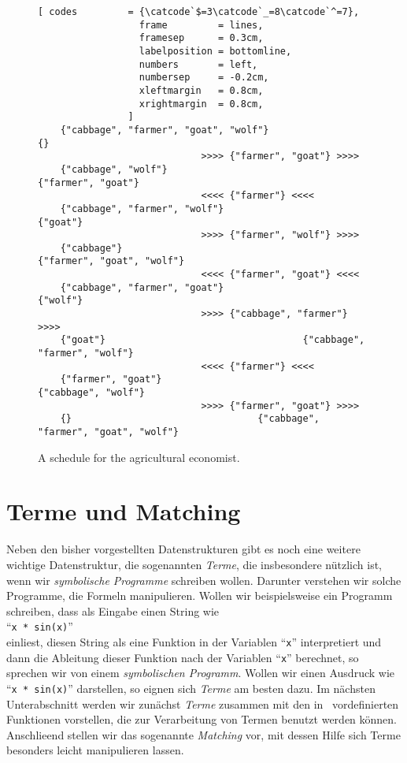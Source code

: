 \begin{figure}[!ht]
  \centering
\begin{Verbatim}[ codes         = {\catcode`$=3\catcode`_=8\catcode`^=7},
                  frame         = lines, 
                  framesep      = 0.3cm, 
                  labelposition = bottomline,
                  numbers       = left,
                  numbersep     = -0.2cm,
                  xleftmargin   = 0.8cm,
                  xrightmargin  = 0.8cm,
                ]
    {"cabbage", "farmer", "goat", "wolf"}                                 {}
                             >>>> {"farmer", "goat"} >>>> 
    {"cabbage", "wolf"}                                   {"farmer", "goat"}
                             <<<< {"farmer"} <<<< 
    {"cabbage", "farmer", "wolf"}                                   {"goat"}
                             >>>> {"farmer", "wolf"} >>>> 
    {"cabbage"}                                   {"farmer", "goat", "wolf"}
                             <<<< {"farmer", "goat"} <<<< 
    {"cabbage", "farmer", "goat"}                                   {"wolf"}
                             >>>> {"cabbage", "farmer"} >>>> 
    {"goat"}                                   {"cabbage", "farmer", "wolf"}
                             <<<< {"farmer"} <<<< 
    {"farmer", "goat"}                                   {"cabbage", "wolf"}
                             >>>> {"farmer", "goat"} >>>> 
    {}                                 {"cabbage", "farmer", "goat", "wolf"}
\end{Verbatim} 
\vspace*{-0.3cm}
\caption{A schedule for the agricultural economist.}  
\label{fig:wolf-ziege-solution}
\end{figure}


\section{Terme und Matching}
Neben den bisher vorgestellten Datenstrukturen gibt es noch eine weitere wichtige
Datenstruktur, die sogenannten \emph{Terme}, die insbesondere n\"{u}tzlich ist, wenn wir
\emph{symbolische Programme} 
schreiben wollen.  Darunter verstehen wir solche Programme, die Formeln manipulieren.
Wollen wir beispielsweise ein Programm schreiben, dass als Eingabe einen String wie
\\[0.2cm]
\hspace*{1.3cm}
``\texttt{x * sin(x)}''
\\[0.2cm]
einliest, diesen String als eine Funktion in der Variablen ``\texttt{x}'' interpretiert
und dann die Ableitung dieser Funktion nach der Variablen ``\texttt{x}'' berechnet, so
sprechen wir von einem \emph{symbolischen Programm}.   Wollen wir einen Ausdruck wie 
``\texttt{x * sin(x)}'' darstellen, so eignen sich \emph{Terme} am besten dazu.
Im n\"{a}chsten Unterabschnitt werden wir zun\"{a}chst \emph{Terme} zusammen mit den in \setl\
vordefinierten Funktionen vorstellen, die zur Verarbeitung von Termen benutzt werden k\"{o}nnen.
Anschlie\3end stellen wir das sogenannte \emph{Matching} vor, mit dessen Hilfe sich Terme
besonders leicht manipulieren lassen.


